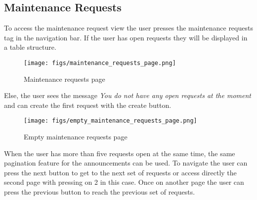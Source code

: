 \documentclass[conference]{IEEEtran}
\begin{document}
\subsection{Maintenance Requests}
To access the maintenance request view the user presses the maintenance requests tag in the navigation bar. If the user has open requests they will be displayed in a table structure.
\begin{figure}[H]
\centering
\texttt{[image: figs/maintenance\_requests\_page.png]}
\caption{Maintenance requests page}
\label{fig:Maintenance requests page}
\end{figure}
Else, the user sees the message \textit{You do not have any open requests at the moment} and can create the first request with the create button.
\begin{figure}[H]
\centering
\texttt{[image: figs/empty\_maintenance\_requests\_page.png]}
\caption{Empty maintenance requests page}
\label{fig:Empty maintenance requests page}
\end{figure}
When the user has more than five requests open at the same time, the same pagination feature for the announcements can be used. To navigate the user can press the next button to get to the next set of requests or access directly the second page with pressing on 2 in this case. Once on another page the user can press the previous button to reach the previous set of requests.
\end{document}
